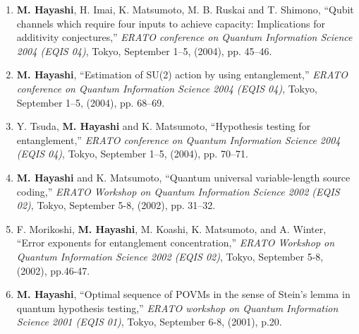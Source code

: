 \documentclass[a4paper,12pt,oneside]{article}
\begin{document}
\begin{enumerate}
\item
\textbf{M. Hayashi}, H. Imai, K. Matsumoto, M. B. Ruskai and T. Shimono, ``Qubit channels which require four inputs to achieve capacity: Implications for additivity conjectures,'' 
{\em ERATO conference on Quantum Information Science 2004 (EQIS 04)}, 
Tokyo, September 1--5, (2004), 
pp. 45--46.

\item
\textbf{M. Hayashi}, ``Estimation of SU(2) action by using entanglement,'' 
{\em ERATO conference on Quantum Information Science 2004 (EQIS 04)}, 
Tokyo, September 1--5, (2004), 
pp. 68--69.

\item
Y. Tsuda, \textbf{M. Hayashi} and K. Matsumoto, ``Hypothesis testing for entanglement,'' 
{\em ERATO conference on Quantum Information Science 2004 (EQIS 04)}, 
Tokyo, September 1--5, (2004), 
pp. 70--71.

\item
\textbf{M. Hayashi} and K. Matsumoto, ``Quantum universal variable-length source coding,'' 
{\em ERATO Workshop on Quantum Information Science 2002 (EQIS 02)}, 
Tokyo, September 5-8, (2002), 
pp. 31--32.

\item
F. Morikoshi, \textbf{M. Hayashi}, M. Koashi, K. Matsumoto, and A. Winter, ``Error exponents for entanglement concentration,'' 
{\em ERATO Workshop on Quantum Information Science 2002 (EQIS 02)}, 
Tokyo, September 5-8, (2002), 
pp.46-47.

\item
\textbf{M. Hayashi}, ``Optimal sequence of POVMs in the sense of Stein's lemma in quantum hypothesis testing,'' 
{\em ERATO workshop on Quantum Information Science 2001 (EQIS 01)}, 
Tokyo, September 6-8, (2001), p.20.

\end{enumerate}
\end{document}
